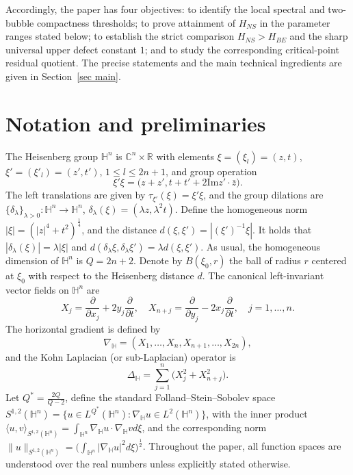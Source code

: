 \documentclass[10pt,a4paper]{amsart}
\begin{document}
Accordingly, the paper has four objectives: to identify the local spectral and two-bubble compactness thresholds; to prove attainment of $H_{NS}$ in the parameter ranges stated below; to establish the strict comparison $H_{NS}>H_{BE}$ and the sharp universal upper defect constant $1$; and to study the corresponding critical-point residual quotient. The precise statements and the main technical ingredients are given in Section~\ref{sec main}.
\endgroup



\section{Notation and preliminaries}\label{secnp}

The Heisenberg group $\mathbb{H}^{n}$ is $\mathbb{C}^{n}\times\mathbb{R}$ with elements $\xi=(\xi_{l})=(z,t)$, $\xi'=(\xi'_{l})=(z',t')$, $1\leq l\leq 2n+1$, and group operation \[\xi'\xi=\big(z+z',t+t'+2\mathrm{Im}z'\cdot\bar{z}\big).\]
The left translations are given by $\tau_{\xi'}(\xi)=\xi'\xi$,
{and the group dilations are}
$\{\delta_{\lambda}\}_{\lambda>0}: \mathbb{H}^{n}\rightarrow\mathbb{H}^{n}$, $\delta_{\lambda}(\xi)=(\lambda z,\lambda^{2}t)$.
Define the homogeneous norm $|\xi|=(|z|^{4}+t^{2})^{\frac{1}{4}}$, and the distance
$d(\xi,\xi')=|(\xi')^{-1}\xi|$.
It holds that $|\delta_{\lambda}(\xi)|=\lambda|\xi|$ and
{$d(\delta_\lambda\xi,\delta_\lambda\xi')=\lambda d(\xi,\xi')$.}
As usual, the homogeneous dimension of $\mathbb{H}^{n}$ is $Q=2n+2$. Denote by $B(\xi_0,r)$ the ball of radius $r$ centered at $\xi_0$ with respect to the Heisenberg distance $d$.
The canonical left-invariant vector fields on $\mathbb{H}^{n}$ are
\begin{equation*}
 X_{j}=\frac{\partial }{\partial x_{j}}+2y_{j}\frac{\partial }{\partial t},\quad X_{n+j}=\frac{\partial}{\partial y_{j}}-2x_{j}\frac{\partial}{\partial t},\quad j=1, \ldots, n.
\end{equation*}
The horizontal gradient is defined by
\begin{equation*}
 \nabla_{\mathbb{H}}=(X_{1}, \ldots, X_{n},X_{n+1}, \ldots, X_{2n}),
\end{equation*}
and the Kohn Laplacian (or sub-Laplacian) operator is
\begin{equation*}
 \Delta_{\mathbb{H}}=\mathop{\sum}\limits_{j=1}^{n}\big(X_{j}^{2}+X_{n+j}^{2}\big).
\end{equation*}
Let $Q^{\ast}=\frac{2Q}{Q-2}$, define the standard Folland--Stein--Sobolev space $S^{1,2}(\mathbb{H}^{n})=\big\{u\in L^{Q^{\ast}}(\mathbb{H}^{n}):\nabla_{\mathbb{H}}u\in L^{2}(\mathbb{H}^{n})\big\}$,
with the inner product $\langle u,v\rangle_{S^{1,2}(\mathbb{H}^{n})}=\int_{\mathbb{H}^{n}}\nabla_{\mathbb{H}}u\cdot\nabla_{\mathbb{H}}v{d}\xi$,
and the corresponding norm $\|u\|_{S^{1,2}(\mathbb{H}^{n})}=\big(\int_{\mathbb{H}^{n}}|\nabla_{\mathbb{H}}u|^{2}{d}\xi\big)^{\frac{1}{2}}$.
Throughout the paper, all function spaces are understood over the real numbers unless explicitly stated otherwise.
\end{document}
